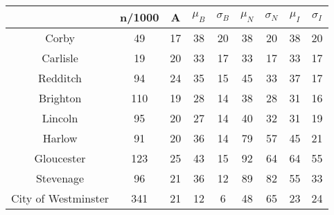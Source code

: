 \begin{tabular}{c|cccccccc}
& n/1000 & A & $\mu_{B}$ & $\sigma_{B}$ & $\mu_{N}$ & $\sigma_{N}$ & $\mu_{I}$ & $\sigma_{I}$ \\
\hline
Corby & 49 & 17 & 38 & 20 & 38 & 20 & 38 & 20 \\
Carlisle & 19 & 20 & 33 & 17 & 33 & 17 & 33 & 17 \\
Redditch & 94 & 24 & 35 & 15 & 45 & 33 & 37 & 17 \\
Brighton & 110 & 19 & 28 & 14 & 38 & 28 & 31 & 16 \\
Lincoln & 95 & 20 & 27 & 14 & 40 & 32 & 31 & 19 \\
Harlow & 91 & 20 & 36 & 14 & 79 & 57 & 45 & 21 \\
Gloucester & 123 & 25 & 43 & 15 & 92 & 64 & 64 & 55 \\
Stevenage & 96 & 21 & 36 & 12 & 89 & 82 & 55 & 33 \\
City of Westminster & 341 & 21 & 12 & 6 & 48 & 65 & 23 & 24 \\
\end{tabular}
